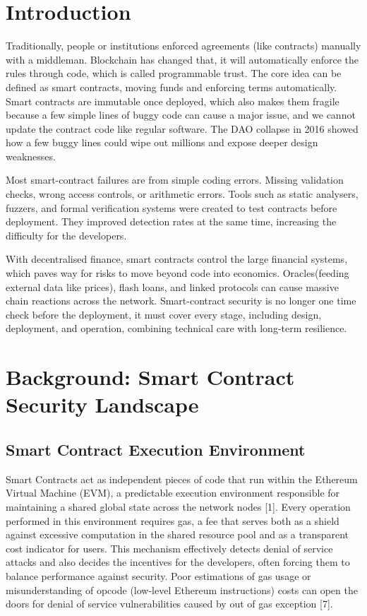 \documentclass[conference]{IEEEtran}
\begin{document}
\section{Introduction}
Traditionally, people or institutions enforced agreements (like contracts) manually with a middleman. Blockchain has changed that, it will automatically enforce the rules through code, which is called programmable trust. The core idea can be defined as smart contracts, moving funds and enforcing terms automatically. Smart contracts are immutable once deployed, which also makes them fragile because a few simple lines of buggy code can cause a major issue, and we cannot update the contract code like regular software. The DAO collapse in 2016 showed how a few buggy lines could wipe out millions and expose deeper design weaknesses.

Most smart-contract failures are from simple coding errors. Missing validation checks, wrong access controls, or arithmetic errors. Tools such as static analysers, fuzzers, and formal verification systems were created to test contracts before deployment. They improved detection rates at the same time, increasing the difficulty for the developers. 

With decentralised finance, smart contracts control the large financial systems, which paves way for risks to move beyond code into economics. Oracles(feeding external data like prices), flash loans, and linked protocols can cause massive chain reactions across the network. Smart-contract security is no longer one time check before the deployment, it must cover every stage, including design, deployment, and operation, combining technical care with long-term resilience.

\section{Background: Smart Contract Security Landscape}

\subsection{Smart Contract Execution Environment}
Smart Contracts act as independent pieces of code that run within the Ethereum Virtual Machine (EVM), a predictable execution environment responsible for maintaining a shared global state across the network nodes [1]. Every operation performed in this environment requires gas, a fee that serves both as a shield against excessive computation in the shared resource pool and as a transparent cost indicator for users. This mechanism effectively detects denial of service attacks and also decides the incentives for the developers, often forcing them to balance performance against security. Poor estimations of gas usage or misunderstanding of opcode (low-level Ethereum instructions) costs can open the doors for denial of service vulnerabilities caused by out of gas exception [7].
\end{document}
